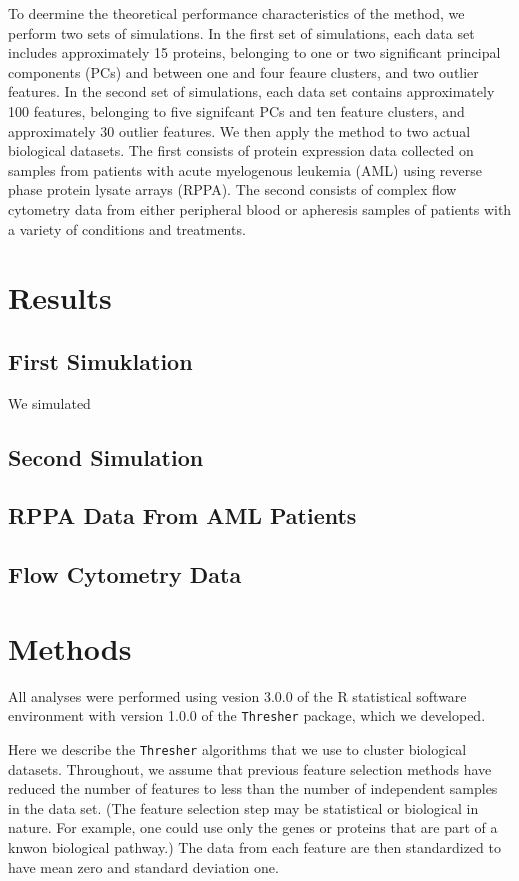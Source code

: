 \documentclass{nature}
\begin{document}
To deermine the theoretical performance characteristics of the method,
we perform two sets of simulations.  In the first set of simulations,
each data set includes approximately 15 proteins, belonging to one or
two significant principal components (PCs) and between one and four
feaure clusters, and two outlier features. In the second set of
simulations, each data set contains approximately 100 features,
belonging to five signifcant PCs and ten feature clusters, and
approximately 30 outlier features. We then apply the method to two
actual biological datasets. The first consists of protein expression
data collected on samples from patients with acute myelogenous
leukemia (AML) using reverse phase protein lysate arrays (RPPA).  The
second consists of complex flow cytometry data from either peripheral
blood or apheresis samples of patients with a variety of conditions
and treatments.

\section{Results}

\subsection{First Simuklation}
We simulated 

\subsection{Second Simulation}

\subsection{RPPA Data From AML Patients}

\subsection{Flow Cytometry Data}

\section{Methods}
All analyses were performed using vesion 3.0.0 of the R statistical
software environment \cite{R} with version 1.0.0 of the
\texttt{Thresher} package, which we developed.

Here we describe the \texttt{Thresher} algorithms that we use to
cluster biological datasets. Throughout, we assume that previous
feature selection methods have reduced the number of features to less
than the number of independent samples in the data set.  (The feature
selection step may be statistical or biological in nature. For
example, one could use only the genes or proteins that are part of a
knwon biological pathway.)  The data from each feature are then
standardized to have mean zero and standard deviation one.
\end{document}
